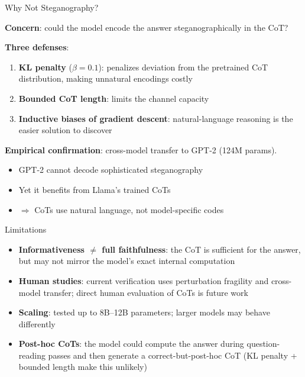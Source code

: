 \documentclass[aspectratio=169]{beamer}
\begin{document}
\begin{frame}{Why Not Steganography?}

\textbf{Concern}: could the model encode the answer steganographically in the CoT?

\bigskip
\textbf{Three defenses}:

\begin{enumerate}
    \item \textbf{KL penalty} ($\beta = 0.1$): penalizes deviation from the pretrained CoT distribution, making unnatural encodings costly
    \item \textbf{Bounded CoT length}: limits the channel capacity
    \item \textbf{Inductive biases of gradient descent}: natural-language reasoning is the easier solution to discover
\end{enumerate}

\bigskip
\textbf{Empirical confirmation}: cross-model transfer to GPT-2 (124M params).
\begin{itemize}
    \item GPT-2 cannot decode sophisticated steganography
    \item Yet it benefits from Llama's trained CoTs
    \item $\Rightarrow$ CoTs use natural language, not model-specific codes
\end{itemize}
\end{frame}

\begin{frame}{Limitations}

\begin{itemize}
    \item \textbf{Informativeness $\neq$ full faithfulness}: the CoT is sufficient for the answer, but may not mirror the model's exact internal computation
    \item \textbf{Human studies}: current verification uses perturbation fragility and cross-model transfer; direct human evaluation of CoTs is future work
    \item \textbf{Scaling}: tested up to 8B--12B parameters; larger models may behave differently
    \item \textbf{Post-hoc CoTs}: the model could compute the answer during question-reading passes and then generate a correct-but-post-hoc CoT (KL penalty + bounded length make this unlikely)
\end{itemize}

\end{frame}
\end{document}

